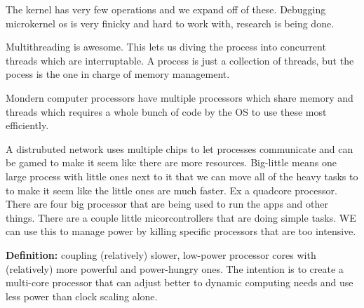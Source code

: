 \documentclass[12pt]{article}
\begin{document}








The kernel has very few operations and we expand off of these. Debugging microkernel os is very finicky and hard to work with, research is being done.

Multithreading is awesome. This lets us diving the process into concurrent threads which are interruptable. A process is just a collection of threads, but the pocess is the one in charge of memory management.

Mondern computer processors have multiple processors which share memory and threads which requires a whole bunch of code by the OS to use these most efficiently.


A distrubuted network uses multiple chips to let processes communicate and can be gamed to make it seem like there are more resources. Big-little means one large process with little ones next to it that we can move all of the heavy tasks to to make it seem like the little ones are much faster. Ex a quadcore processor. There are four big processor that are being used to run the apps and other things. There are a couple little micorcontrollers that are doing simple tasks. WE can use this to manage power by killing specific processors that are too intensive.

\textbf{Definition: } coupling (relatively) slower, low-power processor cores with (relatively) more powerful and power-hungry ones. The intention is to create a multi-core processor that can adjust better to dynamic computing needs and use less power than clock scaling alone.

\end{document}
